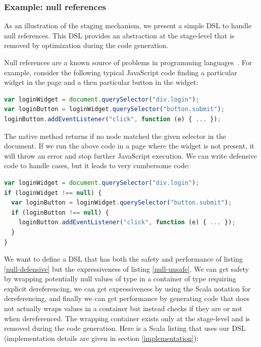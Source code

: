 \documentclass[american,english,runningheads]{llncs}
\begin{document}
\subsubsection{Example: null references}

As an illustration of the staging mechanism, we present a simple DSL to handle null references. This DSL provides an
abstraction at the stage-level that is removed by optimization during the code generation.

Null references are a known source of problems in programming languages~\cite{Hoare09_Null,Nanda09_Null}. For
example, consider the following typical JavaScript code finding a particular widget in the page and a then particular
button in the widget:

\begin{lstlisting}[language=JavaScript,label=null-unsafe,caption=Unsafe code]
var loginWidget = document.querySelector("div.login");
var loginButton = loginWidget.querySelector("button.submit");
loginButton.addEventListener("click", function (e) { ... });
\end{lstlisting}

The native  method returns  if no node matched the given selector in the document. If
we run the above code in a page where the widget is not present, it will throw an error and stop further JavaScript
execution. We can write defensive code to handle  cases, but it leads to very cumbersome code:

\begin{lstlisting}[language=JavaScript,label=null-defensive,caption=Defensive programming to handle null references]
var loginWidget = document.querySelector("div.login");
if (loginWidget !== null) {
  var loginButton = loginWidget.querySelector("button.submit");
  if (loginButton !== null) {
    loginButton.addEventListener("click", function (e) { ... });
  }
}
\end{lstlisting}

We want to define a DSL that has both the safety and performance of listing \ref{null-defensive} but the
expressiveness of listing \ref{null-unsafe}. We can get safety by wrapping potentially null values of type
 in a container of type  requiring explicit dereferencing, we can get
expressiveness by using the Scala  notation for dereferencing, and finally we can get performance by
generating code that does not actually wraps values in a container but instead checks if they are  or not
when dereferenced. The wrapping container exists only at the stage-level and is removed during the code generation.
Here is a Scala listing that uses our DSL (implementation details are given in section \ref{implementation}):
\end{document}
